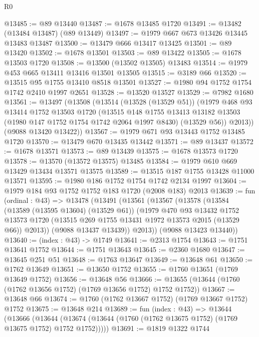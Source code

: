 \begin{lexlean}{R0}
\begin{coremodule}
@13485 := @89 @13440
@13487 := @1678 @13485 @1720
@13491 := @13482 (@13484 @13487) (@89 @13449)
@13497 := @1979 @667 @673 @13426 @13445 @13483 @13487
@13500 := @13479 @666 @13417 @13425
@13501 := @89 @13420
@13502 := @1678 @13501
@13503 := @89 @13422
@13505 := @1678 @13503 @1720
@13508 := @13500 (@13502 @13505) @13483
@13514 := @1979 @453 @665 @13411 @13416 @13501 @13505
@13515 := @3189 @66
@13520 := @13515 @95 @1755 @13410 @8518 @13501
@13527 := @1980 @94 @1752 @1754 @1742 @2410 @1997 @2651
@13528 := @13520 @13527
@13529 := @7982 @1680
@13561 := @13497
    (@13508
      (@13514
        (@13528 (@13529 @51))
        (@1979
          @468
          @93
          @13414
          @1752
          @13503
          @1720
          (@13515
            @148
            @1755
            @13413
            @13182
            @13503
            (@1980 @147 @1752 @1754 @1742 @2064 @1997 @8430)
            (@13529 @56))
          @2013))
      (@9088 @13420 @13422))
@13567 := @1979 @671 @93 @13443 @1752 @13485 @1720
@13570 := @13479 @670 @13435 @13442
@13571 := @89 @13437
@13572 := @1678 @13571
@13573 := @89 @13439
@13575 := @1678 @13573 @1720
@13578 := @13570 (@13572 @13575) @13485
@13584 := @1979 @610 @669 @13429 @13434 @13571 @13575
@13589 := @13515 @187 @1755 @13428 @11000 @13571
@13595 := @1980 @186 @1752 @1754 @1742 @2134 @1997
@13604 := @1979 @184 @93 @1752 @1752 @183 @1720 (@2008 @183) @2013
@13639 := fun (ordinal : @43) =>
  @13478
    (@13491
      (@13561
        (@13567
          (@13578
            (@13584
              (@13589 (@13595 @13604) (@13529 @61))
              (@1979
                @470
                @93
                @13432
                @1752
                @13573
                @1720
                (@13515 @269 @1755 @13431 @1972 @13573 @2015 (@13529 @66))
                @2013))
            (@9088 @13437 @13439))
          @2013))
      (@9088 @13423 @13440))
@13640 := (index : @43) -> @1749
@13641 := @2313 @1754
@13643 := @1751 @13641 @1752
@13644 := @1751 @13643
@13645 := @2360 @1680
@13647 := @13645 @251 @51
@13648 := @1763 @13647
@13649 := @13648 @61
@13650 := @1762 @13649
@13651 := @13650 @1752
@13655 := @1760 @13651 (@1769 @13649 @1752)
@13656 := @13648 @56
@13666 := @13655 (@13644 (@1760 (@1762 @13656 @1752) (@1769 @13656 @1752) @1752 @1752))
@13667 := @13648 @66
@13674 := @1760 (@1762 @13667 @1752) (@1769 @13667 @1752) @1752
@13675 := @13648 @214
@13689 := fun (index : @43) =>
  @13644
    (@13666
      (@13644 (@13674 (@13644 (@1760 (@1762 @13675 @1752) (@1769 @13675 @1752) @1752 @1752)))))
@13691 := @1819 @1322 @1744

\end{coremodule}
\end{lexlean}
